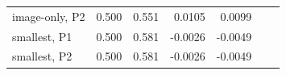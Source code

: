 \begin{tabular}{lrrrrrr}
image-only, P2 & 0.500 & 0.551 & 0.0105 & 0.0099 &  &  \\
smallest, P1 & 0.500 & 0.581 & -0.0026 & -0.0049 &  &  \\
smallest, P2 & 0.500 & 0.581 & -0.0026 & -0.0049 &  &  \\
\bottomrule
\end{tabular}
